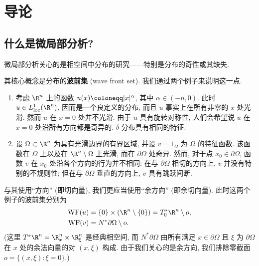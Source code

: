 
\chapter{导论}\label{ch:01}

\section{什么是微局部分析?}\label{sec:1.1}
%
%
%
微局部分析关心的是相空间中分布的研究——特别是分布的奇性或其缺失.

其核心概念是分布的\textbf{波前集} (wave front set). 我们通过两个例子来说明这一点.
\begin{enumerate}
    \item 考虑 $\R^n$ 上的函数 $u(x) \defeq |x|^\alpha$, 其中 $\alpha \in (-n, 0)$. 此时 $u \in L^1_{\mathrm{loc}}(\R^n)$, 因而是一个良定义的分布, 而且 $u$ 事实上在所有非零的 $x$ 处光滑. 然而 $u$ 在 $x = 0$ 处并不光滑. 由于 $u$ 具有旋转对称性, 人们会希望说 $u$ 在 $x = 0$ 处沿所有方向都是奇异的. $\delta$-分布具有相同的特征.
    \item 设 $\Omega \subset \R^n$ 为具有光滑边界的有界区域, 并设 $v = 1_\Omega$ 为 $\Omega$ 的特征函数. 该函数在 $\Omega$ 上以及在 $\R^n \setminus \bar{\Omega}$ 上光滑, 而在 $\partial\Omega$ 处奇异. 然而, 对于点 $x_0 \in \partial\Omega$, 函数 $v$ 在 $x_0$ 处沿各个方向的行为并不相同: 在与 $\partial\Omega$ 相切的方向上, $v$ 并没有特别的不规则性; 但在与 $\partial\Omega$ 垂直的方向上, $v$ 具有跳跃间断.
\end{enumerate}

与其使用``方向'' (即切向量), 我们更应当使用``余方向'' (即余切向量). 此时这两个例子的波前集分别为
\begin{equation}\label{eq:1.1}
    \begin{aligned}
        \WF(u) &= \{0\} \times (\R^n \setminus \{0\}) = T^*_0 \R^n \setminus o, \\
        \WF(v) &= N^* \partial\Omega \setminus o.
    \end{aligned}
\end{equation}
(这里 $T^* \R^n = \R^n_x \times \R^n_\xi$ 是经典相空间, 而 $N^* \partial\Omega$ 由所有满足 $x \in \partial\Omega$ 且 $\xi$ 为 $\partial\Omega$ 在 $x$ 处的余法向量的对 $(x, \xi)$ 构成. 由于我们关心的是余方向, 我们排除零截面 $o = \{(x, \xi) : \xi = 0\}$.)

